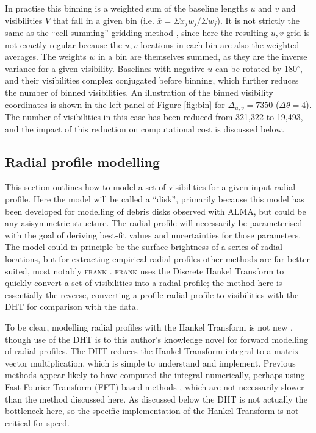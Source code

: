 \documentclass[fleqn,usenatbib]{mnras}
\begin{document}
In practise this binning is a weighted sum of the baseline lengths $u$ and $v$ and visibilities $V$ that fall in a given bin (i.e. $\bar{x} = \Sigma x_j w_j / \Sigma w_j$). It is not strictly the same as the ``cell-summing'' gridding method \citep[e.g.][]{1974AJ.....79...11T}, since here the resulting $u,v$ grid is not exactly regular because the $u,v$ locations in each bin are also the weighted averages. The weights $w$ in a bin are themselves summed, as they are the inverse variance for a given visibility. Baselines with negative $u$ can be rotated by 180$^\circ$, and their visibilities complex conjugated before binning, which further reduces the number of binned visibilities. An illustration of the binned visibility coordinates is shown in the left panel of Figure \ref{fig:bin} for $\Delta_{u,v}=7350$ ($\Delta \theta = 4$\arcsec). The number of visibilities in this case has been reduced from 321,322 to 19,493, and the impact of this reduction on computational cost is discussed below.

\subsection{Radial profile modelling}

This section outlines how to model a set of visibilities for a given input radial profile. Here the model will be called a ``disk'', primarily because this model has been developed for modelling of debris disks observed with ALMA, but could be any asisymmetric structure. The radial profile will necessarily be parameterised with the goal of deriving best-fit values and uncertainties for those parameters. The model could in principle be the surface brightness of a series of radial locations, but for extracting empirical radial profiles other methods are far better suited, most notably \textsc{frank} \citep{2020MNRAS.tmp.1491J}. \textsc{frank} uses the Discrete Hankel Transform to quickly convert a set of visibilities into a radial profile; the method here is essentially the reverse, converting a profile radial profile to visibilities with the DHT for comparison with the data.

To be clear, modelling radial profiles with the Hankel Transform is not new \citep[e.g.][]{2014A&A...563A.136M,2016ApJ...818L..16Z,2018ApJ...869L..48G}, though use of the DHT is to this author's knowledge novel for forward modelling of radial profiles. The DHT reduces the Hankel Transform integral to a matrix-vector multiplication, which is simple to understand and implement. Previous methods appear likely to have computed the integral numerically, perhaps using Fast Fourier Transform (FFT) based methods \citep[e.g.][]{2000MNRAS.312..257H}, which are not necessarily slower than the method discussed here. As discussed below the DHT is not actually the bottleneck here, so the specific implementation of the Hankel Transform is not critical for speed.
\end{document}
